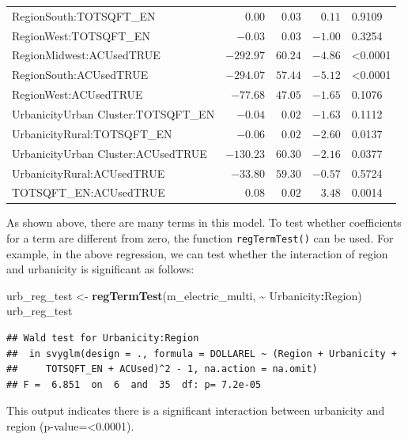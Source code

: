 \documentclass[
]{krantz}
\makeatletter
\newenvironment{Shaded}{\begin{snugshade}}{\end{snugshade}}
\newcommand{\FunctionTok}[1]{\textcolor[rgb]{0.27,0.27,0.27}{\textbf{#1}}}
\newcommand{\NormalTok}[1]{#1}
\newcommand{\OtherTok}[1]{\textcolor[rgb]{0.37,0.37,0.37}{#1}}
\newcommand{\SpecialCharTok}[1]{\textcolor[rgb]{0.43,0.43,0.43}{\textbf{#1}}}
\newenvironment{kframe}{%
\medskip{}
\setlength{\fboxsep}{.8em}
 \def\at@end@of@kframe{}%
 \ifinner\ifhmode%
  \def\at@end@of@kframe{\end{minipage}}%
  \begin{minipage}{\columnwidth}%
 \fi\fi%
 \def\FrameCommand##1{\hskip\@totalleftmargin \hskip-\fboxsep
 \colorbox{shadecolor}{##1}\hskip-\fboxsep
     \hskip-\linewidth \hskip-\@totalleftmargin \hskip\columnwidth}%
 \MakeFramed {\advance\hsize-\width
   \@totalleftmargin\z@ \linewidth\hsize
   \@setminipage}}%
 {\par\unskip\endMakeFramed%
 \at@end@of@kframe}
\renewenvironment{Shaded}{\begin{kframe}}{\end{kframe}}
\makeatother
\begin{document}
\begin{longtable}{lrrrl}
RegionSouth:TOTSQFT\_EN & $0.00$ & $0.03$ & $0.11$ & 0.9109 \\ 
RegionWest:TOTSQFT\_EN & $-0.03$ & $0.03$ & $-1.00$ & 0.3254 \\ 
RegionMidwest:ACUsedTRUE & $-292.97$ & $60.24$ & $-4.86$ & <0.0001 \\ 
RegionSouth:ACUsedTRUE & $-294.07$ & $57.44$ & $-5.12$ & <0.0001 \\ 
RegionWest:ACUsedTRUE & $-77.68$ & $47.05$ & $-1.65$ & 0.1076 \\ 
UrbanicityUrban Cluster:TOTSQFT\_EN & $-0.04$ & $0.02$ & $-1.63$ & 0.1112 \\ 
UrbanicityRural:TOTSQFT\_EN & $-0.06$ & $0.02$ & $-2.60$ & 0.0137 \\ 
UrbanicityUrban Cluster:ACUsedTRUE & $-130.23$ & $60.30$ & $-2.16$ & 0.0377 \\ 
UrbanicityRural:ACUsedTRUE & $-33.80$ & $59.30$ & $-0.57$ & 0.5724 \\ 
TOTSQFT\_EN:ACUsedTRUE & $0.08$ & $0.02$ & $3.48$ & 0.0014 \\ 
\bottomrule
\end{longtable}

As shown above, there are many terms in this model. To test whether coefficients for a term are different from zero, the function \texttt{regTermTest()} can be used. For example, in the above regression, we can test whether the interaction of region and urbanicity is significant as follows:

\begin{Shaded}
\begin{Highlighting}[]
\NormalTok{urb\_reg\_test }\OtherTok{\textless{}{-}} \FunctionTok{regTermTest}\NormalTok{(m\_electric\_multi, }\SpecialCharTok{\textasciitilde{}}\NormalTok{ Urbanicity}\SpecialCharTok{:}\NormalTok{Region)}
\NormalTok{urb\_reg\_test}
\end{Highlighting}
\end{Shaded}

\begin{verbatim}
## Wald test for Urbanicity:Region
##  in svyglm(design = ., formula = DOLLAREL ~ (Region + Urbanicity + 
##     TOTSQFT_EN + ACUsed)^2 - 1, na.action = na.omit)
## F =  6.851  on  6  and  35  df: p= 7.2e-05
\end{verbatim}

This output indicates there is a significant interaction between urbanicity and region (p-value=\textless0.0001).
\end{document}
